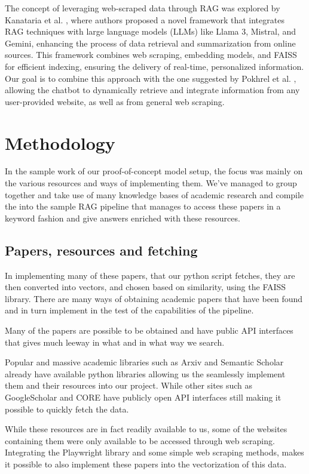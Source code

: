 \documentclass[fleqn,moreauthors,10pt]{ds_report}
\begin{document}
The concept of leveraging web-scraped data through RAG was explored by Kanataria et al. \cite{Kanataria2024}, where authors proposed a novel framework that integrates RAG techniques with large language models (LLMs) like Llama 3, Mistral, and Gemini, enhancing the process of data retrieval and summarization from online sources. This framework combines web scraping, embedding models, and FAISS for efficient indexing, ensuring the delivery of real-time, personalized information. Our goal is to combine this approach with the one suggested by  Pokhrel et al. \cite{Pokhrel2025}, allowing the chatbot to dynamically retrieve and integrate information from any user-provided website, as well as from general web scraping.

\section*{Methodology}

In the sample work of our proof-of-concept model setup, the focus was mainly on the various resources and ways of implementing them. We've managed to group together and take use of many knowledge bases of academic research and compile the into the sample RAG pipeline that manages to access these papers in a keyword fashion and give answers enriched with these resources.

\subsection*{Papers, resources and fetching}

In implementing many of these papers, that our python script fetches, they are then converted into vectors, and chosen based on similarity, using the FAISS library. There are many ways of obtaining academic papers that have been found and in turn implement in the test of the capabilities of the pipeline.

Many of the papers are possible to be obtained and have public API interfaces that gives much leeway in what and in what way we search.

Popular and massive academic libraries such as Arxiv and Semantic Scholar already have available python libraries allowing us the seamlessly implement them and their resources into our project. While other sites such as GoogleScholar and CORE have publicly open API interfaces still making it possible to quickly fetch the data.

While these resources are in fact readily available to us, some of the websites containing them were only available to be accessed through web scraping. Integrating the Playwright library and some simple web scraping methods, makes it possible to also implement these papers into the vectorization of this data.
\end{document}
